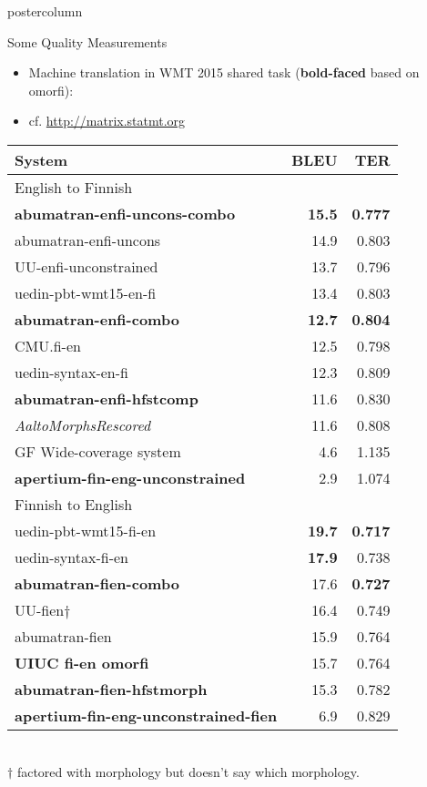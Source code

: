 \documentclass[final,hyperref={pdfpagelabels}]{beamer}
\begin{document}
\begin{frame}
\begin{columns}
\begin{column}{.49\textwidth}
\begin{beamercolorbox}[center,wd=\textwidth]{postercolumn}
\begin{minipage}[T]{.95\textwidth}
{        \begin{block}{Some Quality Measurements}
            \begin{itemize}
                \item Machine translation in WMT 2015 shared task 
                    (\textbf{bold-faced} based on omorfi):
                \item cf. \url{http://matrix.statmt.org}
            \end{itemize}
                    \begin{tabular}{|l|r|r|}
                        \hline
    \bf System & \bf BLEU & \bf TER \\
    \hline
    English to Finnish \\
    \bf abumatran-enfi-uncons-combo & \bf 15.5 & \bf 0.777 \\
    abumatran-enfi-uncons  & 14.9 & 0.803 \\
    UU-enfi-unconstrained  & 13.7 & 0.796 \\
    uedin-pbt-wmt15-en-fi  &  13.4 & 0.803 \\
    \hline
    \bf abumatran-enfi-combo  & \bf 12.7 & \bf 0.804 \\
    CMU.fi-en  & 12.5 & 0.798 \\
    uedin-syntax-en-fi  & 12.3 & 0.809 \\
    \bf abumatran-enfi-hfstcomp & 11.6 & 0.830 \\
    \em AaltoMorphsRescored & 11.6 & 0.808 \\
    \hline
    GF Wide-coverage system & 4.6 & 1.135 \\
    \bf apertium-fin-eng-unconstrained  & 2.9 & 1.074 \\
    \hline
Finnish to English \\
    \hline
    uedin-pbt-wmt15-fi-en & \bf 19.7 & \bf 0.717 \\
    \hline
    uedin-syntax-fi-en & \bf 17.9 & 0.738 \\
    \bf abumatran-fien-combo  & 17.6 & \bf 0.727 \\
    UU-fien$\dagger$ & 16.4 & 0.749 \\
    abumatran-fien & 15.9 & 0.764 \\
    \bf UIUC fi-en omorfi & 15.7 & 0.764 \\
    \bf abumatran-fien-hfstmorph & 15.3 & 0.782 \\
    \hline
    \bf apertium-fin-eng-unconstrained-fien  & 6.9 & 0.829 \\
    \hline
\end{tabular}
\\
$\dagger$ factored with morphology but doesn't say which morphology.



\end{block}}
\end{minipage}
\end{beamercolorbox}
\end{column}
\end{columns}
\end{frame}
\end{document}

